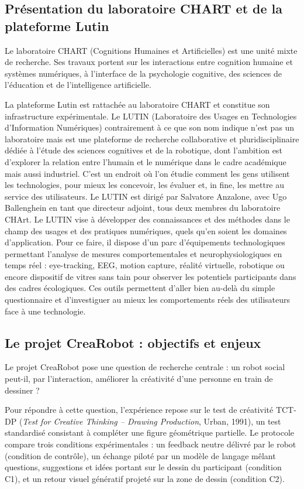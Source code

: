 \documentclass[11pt]{article}
\begin{document}
\subsection{Présentation du laboratoire CHART et de la plateforme Lutin}

Le laboratoire CHART (Cognitions Humaines et Artificielles) est une unité mixte de recherche.
Ses travaux portent sur les interactions entre cognition humaine et systèmes numériques, à
l'interface de la psychologie cognitive, des sciences de l'éducation et de l'intelligence
artificielle.

La plateforme Lutin est rattachée au laboratoire CHART et constitue son infrastructure expérimentale.
Le LUTIN (Laboratoire des Usages en Technologies d'Information Numériques) contrairement à
ce que son nom indique n’est pas un laboratoire mais est une plateforme de recherche collaborative 
et pluridisciplinaire dédiée à l'étude des sciences cognitives et de la robotique, dont l'ambition 
est d'explorer la relation entre l'humain et le numérique dans le cadre académique mais aussi industriel. 
C'est un endroit où l'on étudie comment les gens utilisent les technologies, pour mieux les concevoir, les évaluer et, 
in fine, les mettre au service des utilisateurs. 
Le LUTIN est dirigé par Salvatore Anzalone, avec Ugo Ballenghein en tant que directeur adjoint,
tous deux membres du laboratoire CHArt.
Le LUTIN vise à développer des connaissances et des méthodes dans le champ des usages et des pratiques numériques, quels qu’en soient les domaines d’application. Pour ce faire, il dispose d’un parc d’équipements technologiques permettant l’analyse de mesures comportementales et neurophysiologiques en temps réel : eye-tracking, EEG, motion capture, réalité virtuelle, robotique ou encore dispositif de vitres sans tain pour observer les potentiels participants dans des cadres écologiques. Ces outils permettent d’aller bien au-delà du simple questionnaire et d’investiguer au mieux les comportements réels des utilisateurs face à une technologie.

\subsection{Le projet CreaRobot : objectifs et enjeux}

Le projet CreaRobot pose une question de recherche centrale : un robot social peut-il, par
l'interaction, améliorer la créativité d'une personne en train de dessiner ?

Pour répondre à cette question, l'expérience repose sur le test de créativité TCT-DP
(\textit{Test for Creative Thinking – Drawing Production}, Urban, 1991), un test standardisé
consistant à compléter une figure géométrique partielle. Le protocole compare trois conditions
expérimentales : un feedback neutre délivré par le robot (condition de contrôle), un échange piloté par un modèle de langage mêlant questions, suggestions et idées portant sur le dessin du participant (condition C1), et un retour visuel génératif projeté
sur la zone de dessin (condition C2).
\end{document}
